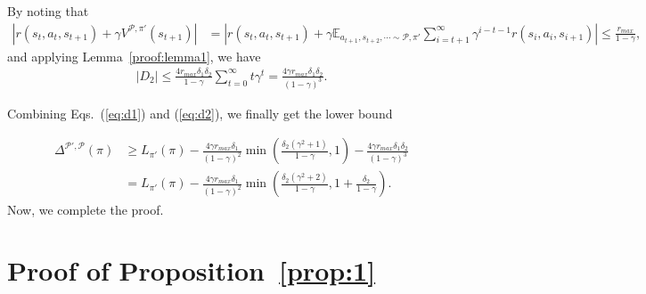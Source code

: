 \documentclass[letterpaper]{article} %
\def\E{{\mathbb{E}}}
\def\P{{\mathcal{P}}}
\begin{document}
By noting that
{\small
\begin{align*}
|r(s_t,a_t,s_{t+1})+\gamma V^{\P, {\pi'}}(s_{t+1})|&=
\left|r(s_t,a_t,s_{t+1})+
\gamma\E_{a_{t+1},s_{t+2},\cdots\sim\P,\pi'}\sum_{i=t+1}^{\infty}\gamma^{i-t-1}r(s_i,a_i,s_{i+1})\right|
\leq\frac{r_{max}}{1-\gamma},
\end{align*}
}\noindent
and applying Lemma~\ref{proof:lemma1}, we have
{\small
\begin{align}
|D_2|\leq\frac{4r_{max}\delta_1\delta_2}{1-\gamma}\sum_{t=0}^\infty t\gamma^t=\frac{4\gamma r_{max}\delta_1\delta_2}{(1-\gamma)^3}.
\label{eq:d2}
\end{align}
}\noindent

Combining Eqs.~(\ref{eq:d1}) and (\ref{eq:d2}), we finally get the lower bound

{\small
\begin{align}
\Delta^{\P',\P}(\pi)
&\geq L_{\pi'}(\pi)-
\frac{4\gamma r_{max}\delta_1}{(1-\gamma)^2}
\min\left(
\frac{\delta_2(\gamma^2+1)}{1-\gamma}, 1
\right)
-
\frac{4\gamma r_{max}\delta_1\delta_2}{(1-\gamma)^3}
\nonumber
\\
&=L_{\pi'}(\pi)-
\frac{4\gamma r_{max}\delta_1}{(1-\gamma)^2}
\min\left(
\frac{\delta_2(\gamma^2+2)}{1-\gamma}, 1+\frac{\delta_2}{1-\gamma}
\right).
\label{eq:lower1}
\end{align}
}\noindent
Now, we complete the proof.

\section{Proof of Proposition~\ref{prop:1}}
\label{sec:proof_prop1}
\proof
\end{document}
